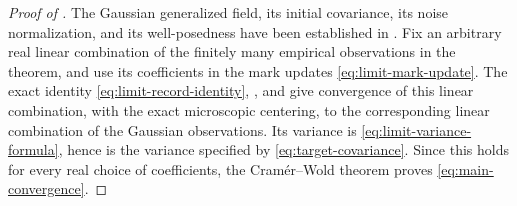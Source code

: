 \begin{proof}[Proof of ]
The Gaussian generalized field, its initial covariance, its noise
normalization, and its well-posedness have been established in
.  Fix an arbitrary real linear combination
of the finitely many empirical observations in the theorem, and use
its coefficients in the mark updates \eqref{eq:limit-mark-update}.
The exact identity \eqref{eq:limit-record-identity},
, and  give convergence
of this linear combination, with the exact microscopic centering, to
the corresponding linear combination of the Gaussian observations.
Its variance is \eqref{eq:limit-variance-formula}, hence is the variance
specified by \eqref{eq:target-covariance}.  Since this holds for every
real choice of coefficients, the Cramér--Wold theorem proves
\eqref{eq:main-convergence}.
\end{proof}
